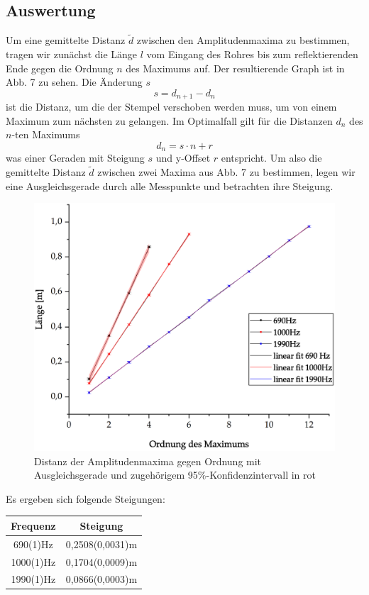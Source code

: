 \documentclass{article}
\begin{document}
\subsection{Auswertung}
Um eine gemittelte Distanz $\widetilde{d}$ zwischen den Amplitudenmaxima zu bestimmen, tragen wir zunächst die Länge $l$ vom Eingang des Rohres bis zum reflektierenden Ende gegen die Ordnung $n$ des Maximums auf. Der resultierende Graph ist in Abb. 7 zu sehen. Die Änderung $s$
\begin{equation}
s = d_{n+1} - d_{n}
\end{equation}
ist die Distanz, um die der Stempel verschoben werden muss, um von einem Maximum zum nächsten zu gelangen. Im Optimalfall gilt für die Distanzen $d_n$ des $n$-ten Maximums
\begin{equation}
d_n = s \cdot n + r
\end{equation}
was einer Geraden mit Steigung $s$ und y-Offset $r$ entspricht.
Um also die gemittelte Distanz $\widetilde{d}$ zwischen zwei Maxima aus Abb. 7 zu bestimmen, legen wir eine Ausgleichsgerade durch alle Messpunkte und betrachten ihre Steigung.
\begin{figure}[hbt!]
\centering
\includegraphics[width = 400pt]{length-vs-order.eps}
\caption{Distanz der Amplitudenmaxima gegen Ordnung mit Ausgleichsgerade und zugehörigem 95\%-Konfidenzintervall in rot}
\end{figure}
Es ergeben sich folgende Steigungen:

\begin{center}
\begin{tabular}{|c|c|}
\hline 
Frequenz & Steigung \\ 
\hline 
690(1)Hz & 0,2508(0,0031)m \\ 
\hline 
1000(1)Hz & 0,1704(0,0009)m \\ 
\hline 
1990(1)Hz & 0,0866(0,0003)m \\ 
\hline 
\end{tabular} 
\end{center}
\end{document}
